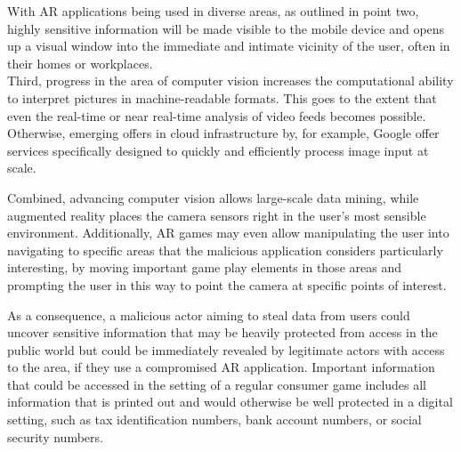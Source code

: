 With AR applications being used in diverse areas, as outlined in point two, highly sensitive information will be made visible to the mobile device and opens up a visual window into the immediate and intimate vicinity of the user, often in their homes or workplaces.\\
Third, progress in the area of computer vision increases the computational ability to interpret pictures in machine-readable formats. This goes to the extent that even the real-time or near real-time analysis of video feeds becomes possible. Otherwise, emerging offers in cloud infrastructure by, for example, Google offer services specifically designed to quickly and efficiently process image input at scale.~\cite{VisionAPI}

Combined, advancing computer vision allows large-scale data mining, while augmented reality places the camera sensors right in the user's most sensible environment.
Additionally, AR games may even allow manipulating the user into navigating to specific areas that the malicious application considers particularly interesting, by moving important game play elements in those areas and prompting the user in this way to point the camera at specific points of interest.

As a consequence, a malicious actor aiming to steal data from users could uncover sensitive information that may be heavily protected from access in the public world but could be immediately revealed by legitimate actors with access to the area, if they use a compromised AR application.
Important information that could be accessed in the setting of a regular consumer game includes all information that is printed out and would otherwise be well protected in a digital setting, such as tax identification numbers, bank account numbers, or social security numbers.

